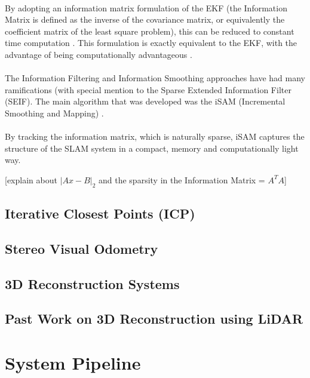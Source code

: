 \documentclass[11pt]{article}
\begin{document}
	\paragraph{}
	By adopting an information matrix formulation of the EKF (the Information Matrix is defined as the inverse of the covariance matrix, or equivalently the coefficient matrix of the least square problem), this can be reduced to constant time computation \cite{doi:10.1117/12.381658}. This formulation is exactly equivalent to the EKF, with the advantage of being computationally advantageous \cite{Dellaert-2006-9639}.
	
	\paragraph{}
	The Information Filtering and Information Smoothing approaches have had many ramifications (with special mention to the Sparse Extended Information Filter (SEIF)\cite{doi:10.1117/12.381658}. The main algorithm that was developed was the iSAM (Incremental Smoothing and Mapping) \cite{Kaess08tro}.
	
	\paragraph{}
	By tracking the information matrix, which is naturally sparse, iSAM captures the structure of the SLAM system in a compact, memory and computationally light way.
	
	[explain about $|Ax-B|_2$ and the sparsity in the Information Matrix = $A^TA$]
	
	\subsection{Iterative Closest Points (ICP)}
	\subsection{Stereo Visual Odometry}
	\subsection{3D Reconstruction Systems}
	\subsection{Past Work on 3D Reconstruction using LiDAR}
	

	\newpage
	\section{System Pipeline} \label{pipeline}
\end{document}
